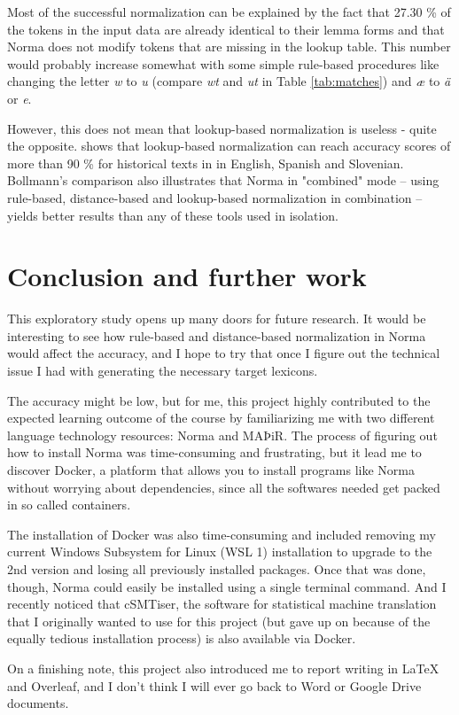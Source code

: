 \documentclass[11pt,a4paper]{article}
\begin{document}
Most of the successful normalization can be explained by the fact that 27.30 \% of the tokens in the input data are already identical to their lemma forms and that Norma does not modify tokens that are missing in the lookup table. This number would probably increase somewhat with some simple rule-based procedures like changing the letter \emph{w} to \emph{u} (compare \emph{wt} and \emph{ut} in Table \ref{tab:matches}) and \emph{æ} to \emph{ä} or \emph{e}.

However, this does not mean that lookup-based normalization is useless - quite the opposite. \citet{bollmann:19} shows that lookup-based normalization can reach accuracy scores of more than 90 \% for historical texts in in English, Spanish and Slovenian. Bollmann's comparison also illustrates that Norma in "combined" mode -- using rule-based, distance-based and lookup-based normalization in combination -- yields better results than any of these tools used in isolation.

\section{Conclusion and further work}

This exploratory study opens up many doors for future research. It would be interesting to see how rule-based and distance-based normalization in Norma would affect the accuracy, and I hope to try that once I figure out the technical issue I had with generating the necessary target lexicons.

The accuracy might be low, but for me, this project highly contributed to the expected learning outcome of the course by familiarizing me with two different language technology resources: Norma and MAÞiR. The process of figuring out how to install Norma was time-consuming and frustrating, but it lead me to discover Docker, a platform that allows you to install programs like Norma without worrying about dependencies, since all the softwares needed get packed in so called containers. 

The installation of Docker was also time-consuming and included removing my current Windows Subsystem for Linux (WSL 1) installation to upgrade to the 2nd version and losing all previously installed packages. Once that was done, though, Norma could easily be installed using a single terminal command. And I recently noticed that cSMTiser, the software for statistical machine translation that I originally wanted to use for this project (but gave up on because of the equally tedious installation process) is also available via Docker.

On a finishing note, this project also introduced me to report writing in LaTeX and Overleaf, and I don't think I will ever go back to Word or Google Drive documents. 

 

\end{document}
